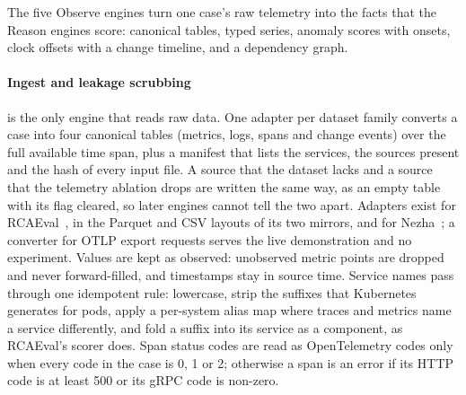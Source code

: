 The five Observe engines turn one case's raw telemetry into the facts that the Reason engines score: canonical tables, typed series, anomaly scores with onsets, clock offsets with a change timeline, and a dependency graph.

\paragraph{Ingest and leakage scrubbing}
 is the only engine that reads raw data.
One adapter per dataset family converts a case into four canonical tables (metrics, logs, spans and change events) over the full available time span, plus a manifest that lists the services, the sources present and the hash of every input file.
A source that the dataset lacks and a source that the telemetry ablation drops are written the same way, as an empty table with its flag cleared, so later engines cannot tell the two apart.
Adapters exist for RCAEval~\cite{rcaeval2024}, in the Parquet and CSV layouts of its two mirrors, and for Nezha~\cite{nezha2023}; a converter for OTLP export requests serves the live demonstration and no experiment.
Values are kept as observed: unobserved metric points are dropped and never forward-filled, and timestamps stay in source time.
Service names pass through one idempotent rule: lowercase, strip the suffixes that Kubernetes generates for pods, apply a per-system alias map where traces and metrics name a service differently, and fold a  suffix into its service as a component, as RCAEval's scorer does.
Span status codes are read as OpenTelemetry codes only when every code in the case is 0, 1 or 2; otherwise a span is an error if its HTTP code is at least 500 or its gRPC code is non-zero.

